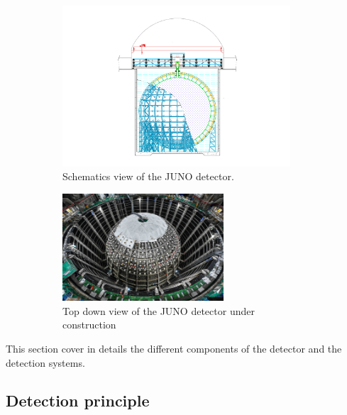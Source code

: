 \documentclass[../main.tex]{subfiles}
\begin{document}
\begin{figure}[ht]
  \centering
  \begin{subfigure}[b]{0.45\textwidth}
    \centering
    \includegraphics[height=6cm]{images/juno/drawing_schema.png}
    \caption{Schematics view of the JUNO detector.}
    \label{fig:juno:juno-schema}
  \end{subfigure}
  \hfill
  \begin{subfigure}[b]{0.45\textwidth}
    \centering
    \includegraphics[height=4cm]{images/juno/top_down_view.jpg}
    \caption{Top down view of the JUNO detector under construction}
  \end{subfigure}
  \caption{}
\end{figure}

This section cover in details the different components of the detector and the detection systems.

\subsection{Detection principle}
\label{sec:juno:detct}
\end{document}

